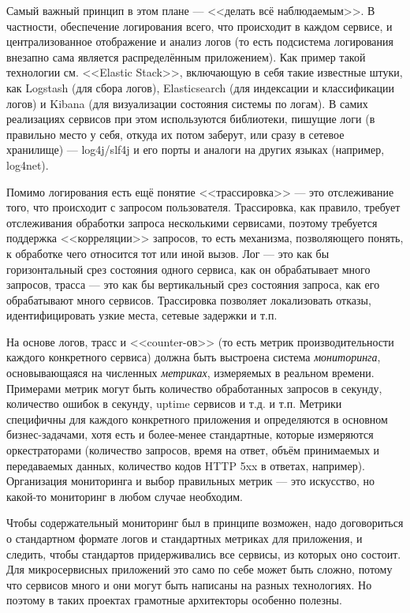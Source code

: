 \documentclass[a5paper]{article}
\begin{document}
Самый важный принцип в этом плане --- <<делать всё наблюдаемым>>. В частности, обеспечение логирования всего, что происходит в каждом сервисе, и централизованное отображение и анализ логов (то есть подсистема логирования внезапно сама является распределённым приложением). Как пример такой технологии см. <<Elastic Stack>>, включающую в себя такие известные штуки, как Logstash (для сбора логов), Elasticsearch (для индексации и классификации логов) и Kibana (для визуализации состояния системы по логам). В самих реализациях сервисов при этом используются библиотеки, пишущие логи (в правильно место у себя, откуда их потом заберут, или сразу в сетевое хранилище) --- log4j/slf4j и его порты и аналоги на других языках (например, log4net).

Помимо логирования есть ещё понятие <<трассировка>> --- это отслеживание того, что происходит с запросом пользователя. Трассировка, как правило, требует отслеживания обработки запроса несколькими сервисами, поэтому требуется поддержка <<корреляции>> запросов, то есть механизма, позволяющего понять, к обработке чего относится тот или иной вызов. Лог --- это как бы горизонтальный срез состояния одного сервиса, как он обрабатывает много запросов, трасса --- это как бы вертикальный срез состояния запроса, как его обрабатывают много сервисов. Трассировка позволяет локализовать отказы, идентифицировать узкие места, сетевые задержки и т.п.

На основе логов, трасс и <<counter-ов>> (то есть метрик производительности каждого конкретного сервиса) должна быть выстроена система \emph{мониторинга}, основывающаяся на численных \emph{метриках}, измеряемых в реальном времени. Примерами метрик могут быть количество обработанных запросов в секунду, количество ошибок в секунду, uptime сервисов и т.д. и т.п. Метрики специфичны для каждого конкретного приложения и определяются в основном бизнес-задачами, хотя есть и более-менее стандартные, которые измеряются оркестраторами (количество запросов, время на ответ, объём принимаемых и передаваемых данных, количество кодов HTTP 5xx в ответах, например). Организация мониторинга и выбор правильных метрик --- это искусство, но какой-то мониторинг в любом случае необходим.

Чтобы содержательный мониторинг был в принципе возможен, надо договориться о стандартном формате логов и стандартных метриках для приложения, и следить, чтобы стандартов придерживались все сервисы, из которых оно состоит. Для микросервисных приложений это само по себе может быть сложно, потому что сервисов много и они могут быть написаны на разных технологиях. Но поэтому в таких проектах грамотные архитекторы особенно полезны.
\end{document}
